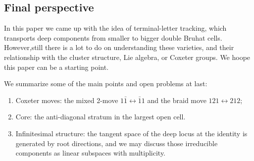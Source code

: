 \documentclass[12pt]{amsart}
\theoremstyle{plain}
\theoremstyle{definition}
\theoremstyle{remark}
\begin{document}
\subsection{Final perspective}

In this paper we came up with the idea of terminal-letter tracking, which transports deep components from smaller to bigger double Bruhat cells.  However,still there is a lot to do on understanding these varieties, and their relationship with the cluster structure, Lie algebra, or Coxeter groups. We hoope this paper can be a starting point.

We summarize some of the main points and open problems at last:

\begin{enumerate}
\item Coxeter moves: the mixed 2-move \(1\bar{1}\leftrightarrow \bar{1}1\) and the braid move \(121\leftrightarrow 212\);
\item Core: the anti-diagonal stratum in the largest open cell.
\item Infinitesimal structure: the tangent space of the deep locus at the identity is generated by root directions, and we may discuss those irreducible components as linear subspaces with multiplicity.

\end{enumerate}




\appendix
\end{document}
